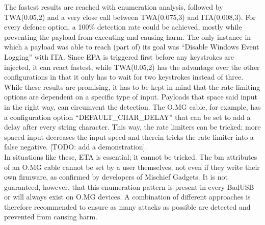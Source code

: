 The fastest results are reached with enumeration analysis, followed by TWA(0.05,2) and a very close call between TWA(0.075,3) and ITA(0.008,3). For every defence option, a 100\% detection rate could be achieved, mostly while preventing the payload from executing and causing harm. The only instance in which a payload was able to reach (part of) its goal was ``Disable Windows Event Logging'' with ITA. Since EPA is triggered first before any keystrokes are injected, it can react fastest, while TWA(0.05,2) has the advantage over the other configurations in that it only has to wait for two keystrokes instead of three. \\
While these results are promising, it has to be kept in mind that the rate-limiting options are dependent on a specific type of input. Payloads that space said input in the right way, can circumvent the detection. The O.MG cable, for example, has a configuration option ``DEFAULT\_CHAR\_DELAY'' that can be set to add a delay after every string character. This way, the rate limiters can be tricked; more spaced input decreases the input speed and therein tricks the rate limiter into a false negative. [TODO: add a demonstration]. \\
In situations like these, ETA is essential; it cannot be tricked. The bm attributes of an O.MG cable cannot be set by a user themselves, not even if they write their own firmware, as confirmed by developers of Mischief Gadgets. It is not guaranteed, however, that this enumeration pattern is present in every BadUSB or will always exist on O.MG devices. A combination of different approaches is therefore recommended to ensure as many attacks as possible are detected and prevented from causing harm. 



